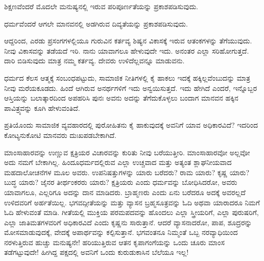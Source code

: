 \vspace{0.2cm}

ಶಿಕ್ಷಣವೆಂದರೆ ಮೊದಲೇ ಮನುಷ್ಯನಲ್ಲಿ ಇರುವ ಪರಿಪೂರ್ಣತೆಯನ್ನು ಪ್ರಕಾಶಪಡಿಸುವುದು.

\vspace{0.2cm}

ಧರ್ಮವೆಂದರೆ ಆಗಲೇ ಮಾನವನಲ್ಲಿ ಅಡಗಿರುವ ದಿವ್ಯತೆಯನ್ನು ಪ್ರಕಾಶಪಡಿಸುವುದು.

\vspace{0.2cm}

ಆದ್ದರಿಂದ, ಎರಡು ಪ್ರಸಂಗಗಳಲ್ಲಿಯೂ ಗುರುವಿನ ಕರ್ತವ್ಯ ಶಿಷ್ಯನ ವಿಕಾಸಕ್ಕೆ ಇರುವ ಆತಂಕಗಳನ್ನು ತೆಗೆಯುವುದು. ನೀವು ವಿಕಾಸವನ್ನು ತಡೆಯದೆ ಇರಿ. ನಾನು ಯಾವಾಗಲೂ ಹೇಳುವುದೇ ಇದು. ಅನಂತರ ಎಲ್ಲಾ ಸರಿಹೋಗುತ್ತದೆ. ದಾರಿ ಬಿಡಿಸುವುದು ಮಾತ್ರ ನಮ್ಮ ಕರ್ತವ್ಯ. ದೇವರು ಉಳಿದೆಲ್ಲವನ್ನೂ ಮಾಡುವನು.

\vspace{0.2cm}

ಧರ್ಮದ ಕೆಲಸ ಆತ್ಮಕ್ಕೆ ಸಂಬಂಧಪಟ್ಟುದು, ಸಾಮಾಜಿಕ ನೀತಿಗಳಲ್ಲಿ ಕೈ ಹಾಕಲು ಇದಕ್ಕೆ ಹಕ್ಕಿಲ್ಲವೆಂಬುದನ್ನು ಮಾತ್ರ ನೀವು ಮರೆಯಕೂಡದು. ಹಿಂದೆ ಆಗಿರುವ ಅನರ್ಥಗಳಿಗೆ ಇದು ಅನ್ವಯಿಸುತ್ತದೆ. ಇದು ಹೇಗಿದೆ ಎಂದರೆ, ಇನ್ನೊಬ್ಬರ ಆಸ್ತಿಯನ್ನು ಬಲಾತ್ಕಾರದಿಂದ ಅಪಹರಿಸಿ ಪುನಃ ಅವನು ಅದನ್ನು ತೆಗೆದುಕೊಳ್ಳಲು ಬಂದಾಗ ಮಾನವನ ಹಕ್ಕಿನ ಪಾವಿತ್ರ್ಯವನ್ನು ಕೂಗಿ ಹೇಳುವಂತಿದೆ.

\vspace{0.2cm}

ಪ್ರತಿಯೊಂದು ಸಾಮಾಜಿಕ ವ್ಯವಹಾರದಲ್ಲಿ ಪುರೋಹಿತನು ಕೈ ಹಾಕುವುದಕ್ಕೆ ಅವನಿಗೆ ಯಾವ ಅಧಿಕಾರವಿದೆ? ಇದರಿಂದ ಕೋಟ್ಯನುಕೋಟಿ ಮಾನವರು ದುಃಖಪಡಬೇಕಾಗಿದೆ.

\vspace{0.2cm}
ಮಾಂಸಾಹಾರವನ್ನು ಉಣ್ಣುವ ಕ್ಷತ್ರಿಯರ ವಿಚಾರವನ್ನು ಕುರಿತು ನೀವು ಬರೆಯುತ್ತೀರಿ. ಮಾಂಸಾಹಾರವೋ ಅಲ್ಲವೋ ಅದು ನಮಗೆ ಬೇಕಾಗಿಲ್ಲ. ಹಿಂದೂಧರ್ಮದಲ್ಲಿರುವ ಎಲ್ಲಾ ಉಚ್ಚವಾದ ಮತ್ತು ಅತ್ಯಂತ ಶ್ಲಾಘನೀಯವಾದ ಮಹದಾಲೋಚನೆಗಳ ಮೂಲ ಅವರು. ಉಪನಿಷತ್ತುಗಳನ್ನು ಯಾರು ಬರೆದರು? ರಾಮ ಯಾರು? ಕೃಷ್ಣ ಯಾರು? ಬುದ್ಧ ಯಾರು? ಜೈನರ ತೀರ್ಥಂಕರರು ಯಾರು? ಕ್ಷತ್ರಿಯರು ಎಂದು ಧರ್ಮವನ್ನು ಬೋಧಿಸಿದರೋ, ಅವರು ಯಾವಾಗಲೂ, ಎಲ್ಲರಿಗೂ ಅದನ್ನು ದಾನ ಮಾಡಿದರು. ಬ್ರಾಹ್ಮಣರು ಎಂದು ಏನು ಬರೆದರೂ ಅದಕ್ಕೆ ಅವರಲ್ಲದೆ ಉಳಿದವರಿಗೆ ಅರ್ಹತೆಯಿಲ್ಲ. ಭಗವದ್ಗೀತೆಯನ್ನು ಮತ್ತು ವ್ಯಾಸನ ಬ್ರಹ್ಮಸೂತ್ರವನ್ನು ಓದಿ ಅಥವಾ ಯಾರಾದರೂ ನಿಮಗೆ ಓದಿ ಹೇಳುವಂತೆ ಮಾಡಿ. ಗೀತೆಯಲ್ಲಿ ಮುಕ್ತಿಯ ಪರಮಪದವನ್ನು ಹೊಂದಲು ಎಲ್ಲಾ ಸ್ತ್ರೀಯರಿಗೆ, ಎಲ್ಲಾ ಪುರುಷರಿಗೆ, ಎಲ್ಲಾ ಜಾತಿಮತಗಳವರಿಗೆ ಅಧಿಕಾರವಿದೆ ಎಂದು ಕೃಷ್ಣನು ಸಾರುತ್ತಾನೆ. ಆದರೆ ವ್ಯಾಸನಾದರೋ, ಪಾಪ, ಶೂದ್ರರನ್ನು ಮೋಸಮಾಡುವುದಕ್ಕೆ, ವೇದಕ್ಕೆ ಅಪಾರ್ಥವನ್ನು ಕಲ್ಪಿಸುತ್ತಾನೆ. ಭಗವಂತನೂ ನಿಮ್ಮಂತೆ ಒಬ್ಬ ನರವ್ಯಾಧಿಯಿಂದ ನರಳುತ್ತಿರುವ ಹುಚ್ಚು ಮನುಷ್ಯನೇ! ಹರಿಯುತ್ತಿರುವ ಆತನ ಕೃಪಾಗಂಗೆಯನ್ನು ಒಂದು ಚೂರು ಮಾಂಸ ತಡೆಗಟ್ಟುವುದೇ! ಹೀಗಿದ್ದ ಪಕ್ಷದಲ್ಲಿ ಅವನಿಗೆ ಒಂದು ಕುರುಡುಕಾಸಿನ ಬೆಲೆಯೂ ಇಲ್ಲ!

\vspace{0.2cm}

